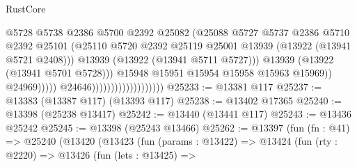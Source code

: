 \begin{lexlean}{RustCore}
\begin{coremodule}
                                                          @5728
                                                          @5738
                                                          @2386
                                                          @5700
                                                          @2392
                                                          @25082
                                                          (@25088
                                                            @5727
                                                            @5737
                                                            @2386
                                                            @5710
                                                            @2392
                                                            @25101
                                                            (@25110
                                                              @5720
                                                              @2392
                                                              @25119
                                                              @25001
                                                              @13939
                                                              (@13922 (@13941 @5721 @2408)))
                                                            @13939
                                                            (@13922 (@13941 @5711 @5727)))
                                                          @13939
                                                          (@13922 (@13941 @5701 @5728)))
                                                        @15948
                                                        @15951
                                                        @15954
                                                        @15958
                                                        @15963
                                                        @15969))
                                                    @24969)))))
                                          @24646)))))))))))))))))))
@25233 := @13381 @117
@25237 := @13383 (@13387 @117) (@13393 @117)
@25238 := @13402 @17365
@25240 := @13398 (@25238 @13417)
@25242 := @13440 (@13441 @117)
@25243 := @13436 @25242
@25245 := @13398 (@25243 @13466)
@25262 := @13397
    (fun (fn : @41) =>
    @25240
      (@13420
        (@13423
          (fun (params : @13422) =>
          @13424
            (fun (rty : @2220) =>
            @13426
              (fun (lets : @13425) =>

\end{coremodule}
\end{lexlean}
